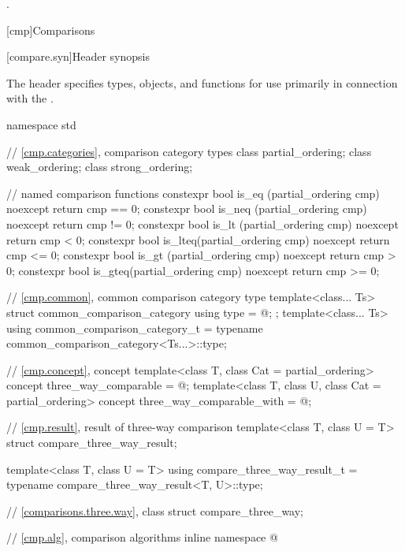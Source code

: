 \begin{itemdescr}
\pnum
\returns
{}.
\end{itemdescr}

[cmp]{Comparisons}

[compare.syn]{Header  synopsis}

\pnum
The header  specifies types, objects, and functions
for use primarily in connection with
the .

%
%
%
%
%
%
%
%
\begin{codeblock}
namespace std {
  // \ref{cmp.categories}, comparison category types
  class partial_ordering;
  class weak_ordering;
  class strong_ordering;

  // named comparison functions
  constexpr bool is_eq  (partial_ordering cmp) noexcept { return cmp == 0; }
  constexpr bool is_neq (partial_ordering cmp) noexcept { return cmp != 0; }
  constexpr bool is_lt  (partial_ordering cmp) noexcept { return cmp < 0; }
  constexpr bool is_lteq(partial_ordering cmp) noexcept { return cmp <= 0; }
  constexpr bool is_gt  (partial_ordering cmp) noexcept { return cmp > 0; }
  constexpr bool is_gteq(partial_ordering cmp) noexcept { return cmp >= 0; }

  // \ref{cmp.common}, common comparison category type
  template<class... Ts>
  struct common_comparison_category {
    using type = @\seebelow@;
  };
  template<class... Ts>
    using common_comparison_category_t = typename common_comparison_category<Ts...>::type;

  // \ref{cmp.concept}, concept 
  template<class T, class Cat = partial_ordering>
    concept three_way_comparable = @\seebelow@;
  template<class T, class U, class Cat = partial_ordering>
    concept three_way_comparable_with = @\seebelow@;

  // \ref{cmp.result}, result of three-way comparison
  template<class T, class U = T> struct compare_three_way_result;

  template<class T, class U = T>
    using compare_three_way_result_t = typename compare_three_way_result<T, U>::type;

  // \ref{comparisons.three.way}, class 
  struct compare_three_way;

  // \ref{cmp.alg}, comparison algorithms
  inline namespace @
}
\end{codeblock}

